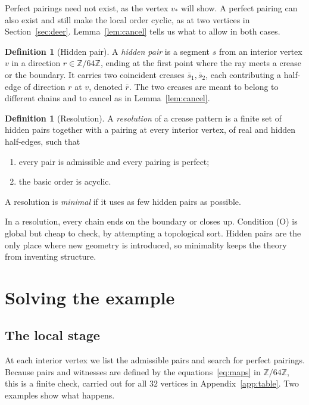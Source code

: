 \documentclass[11pt]{article}
\theoremstyle{definition}
\newtheorem{definition}[theorem]{Definition}
\theoremstyle{remark}
\newcommand{\Z}{\mathbb{Z}}
\newcommand{\ZN}{\Z/64\Z}
\newcommand{\vstar}{v_\ast}
\begin{document}
Perfect pairings need not exist, as the vertex $\vstar$ will show. A perfect pairing can also exist and still make the local order cyclic, as at two vertices in Section~\ref{sec:deer}. Lemma~\ref{lem:cancel} tells us what to allow in both cases.

\begin{definition}[Hidden pair]
A \emph{hidden pair} is a segment $s$ from an interior vertex $v$ in a direction $r\in\ZN$, ending at the first point where the ray meets a crease or the boundary. It carries two coincident creases $\bar s_1,\bar s_2$, each contributing a half-edge of direction $r$ at $v$, denoted $\bar r$. The two creases are meant to belong to different chains and to cancel as in Lemma~\ref{lem:cancel}.
\end{definition}

\begin{definition}[Resolution]
A \emph{resolution} of a crease pattern is a finite set of hidden pairs together with a pairing at every interior vertex, of real and hidden half-edges, such that
\begin{enumerate}
\item[(L)] every pair is admissible and every pairing is perfect;
\item[(O)] the basic order is acyclic.
\end{enumerate}
A resolution is \emph{minimal} if it uses as few hidden pairs as possible.
\end{definition}

In a resolution, every chain ends on the boundary or closes up. Condition (O) is global but cheap to check, by attempting a topological sort. Hidden pairs are the only place where new geometry is introduced, so minimality keeps the theory from inventing structure.

\section{Solving the example}\label{sec:solve}

\subsection{The local stage}

At each interior vertex we list the admissible pairs and search for perfect pairings. Because pairs and witnesses are defined by the equations~\eqref{eq:maps} in $\ZN$, this is a finite check, carried out for all $32$ vertices in Appendix~\ref{app:table}. Two examples show what happens.
\end{document}
